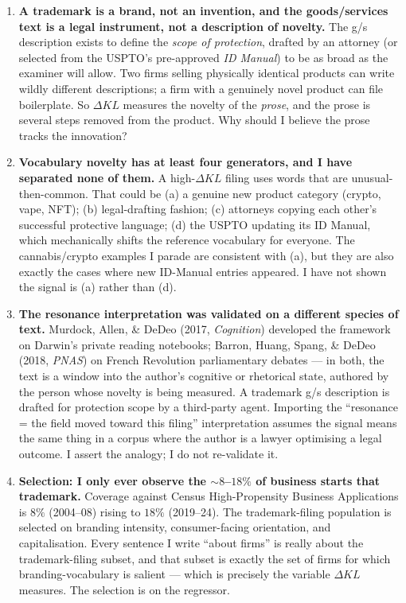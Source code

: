 \documentclass[11pt]{article}
\newcommand{\dkl}{\Delta KL}
\begin{document}
\begin{enumerate}[leftmargin=*]
\item \textbf{A trademark is a brand, not an invention, and the
goods/services text is a legal instrument, not a description of
novelty.} The g/s description exists to define the \emph{scope of
protection}, drafted by an attorney (or selected from the USPTO's
pre-approved \emph{ID Manual}) to be as broad as the examiner will
allow. Two firms selling physically identical products can write
wildly different descriptions; a firm with a genuinely novel product
can file boilerplate. So $\dkl$ measures the novelty of the
\emph{prose}, and the prose is several steps removed from the
product. Why should I believe the prose tracks the innovation?

\item \textbf{Vocabulary novelty has at least four generators, and I
have separated none of them.} A high-$\dkl$ filing uses words that
are unusual-then-common. That could be (a) a genuine new product
category (crypto, vape, NFT); (b) legal-drafting fashion; (c)
attorneys copying each other's successful protective language; (d)
the USPTO updating its ID Manual, which mechanically shifts the
reference vocabulary for everyone. The cannabis/crypto examples I
parade are consistent with (a), but they are also exactly the cases
where new ID-Manual entries appeared. I have not shown the signal
is (a) rather than (d).

\item \textbf{The resonance interpretation was validated on a
different species of text.} Murdock, Allen, \& DeDeo (2017,
\emph{Cognition}) developed the framework on Darwin's private
reading notebooks; Barron, Huang, Spang, \& DeDeo (2018,
\emph{PNAS}) on French Revolution parliamentary debates --- in both,
the text is a window into the author's cognitive or rhetorical
state, authored by the person whose novelty is being measured. A
trademark
g/s description is drafted for protection scope by a third-party
agent. Importing the ``resonance = the field moved toward this
filing'' interpretation assumes the signal means the same thing in
a corpus where the author is a lawyer optimising a legal outcome. I
assert the analogy; I do not re-validate it.

\item \textbf{Selection: I only ever observe the $\sim 8$--$18\%$ of
business starts that trademark.} Coverage against Census
High-Propensity Business Applications is $8\%$ (2004--08) rising to
$18\%$ (2019--24). The trademark-filing population is selected on
branding intensity, consumer-facing orientation, and capitalisation.
Every sentence I write ``about firms'' is really about the
trademark-filing subset, and that subset is exactly the set of firms
for which branding-vocabulary is salient --- which is precisely the
variable $\dkl$ measures. The selection is on the regressor.


\end{enumerate}
\end{document}

